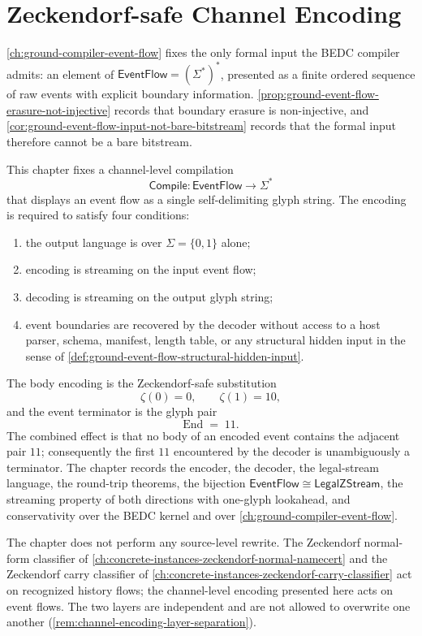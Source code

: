 \chapter{Zeckendorf-safe Channel Encoding}
\label{ch:ground-compiler-zeckendorf-safe-channel-encoding}

\autoref{ch:ground-compiler-event-flow} fixes the only formal input the BEDC compiler admits: an element of $\mathsf{EventFlow} = (\Sigma^{*})^{*}$, presented as a finite ordered sequence of raw events with explicit boundary information. \autoref{prop:ground-event-flow-erasure-not-injective} records that boundary erasure is non-injective, and \autoref{cor:ground-event-flow-input-not-bare-bitstream} records that the formal input therefore cannot be a bare bitstream.

This chapter fixes a channel-level compilation
$$
  \mathsf{Compile} \colon \mathsf{EventFlow} \longrightarrow \Sigma^{*}
$$
that displays an event flow as a single self-delimiting glyph string. The encoding is required to satisfy four conditions:
\begin{enumerate}
  \item the output language is over $\Sigma = \{0, 1\}$ alone;
  \item encoding is streaming on the input event flow;
  \item decoding is streaming on the output glyph string;
  \item event boundaries are recovered by the decoder without access to a host parser, schema, manifest, length table, or any structural hidden input in the sense of \autoref{def:ground-event-flow-structural-hidden-input}.
\end{enumerate}
The body encoding is the Zeckendorf-safe substitution
$$
  \zeta(0) = 0,
  \qquad
  \zeta(1) = 10,
$$
and the event terminator is the glyph pair
$$
  \mathrm{End} \;=\; 11.
$$
The combined effect is that no body of an encoded event contains the adjacent pair $11$; consequently the first $11$ encountered by the decoder is unambiguously a terminator. The chapter records the encoder, the decoder, the legal-stream language, the round-trip theorems, the bijection $\mathsf{EventFlow} \cong \mathsf{LegalZStream}$, the streaming property of both directions with one-glyph lookahead, and conservativity over the BEDC kernel and over \autoref{ch:ground-compiler-event-flow}.

The chapter does not perform any source-level rewrite. The Zeckendorf normal-form classifier of \autoref{ch:concrete-instances-zeckendorf-normal-namecert} and the Zeckendorf carry classifier of \autoref{ch:concrete-instances-zeckendorf-carry-classifier} act on recognized history flows; the channel-level encoding presented here acts on event flows. The two layers are independent and are not allowed to overwrite one another (\autoref{rem:channel-encoding-layer-separation}).


